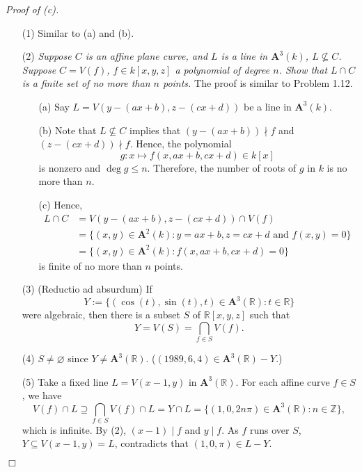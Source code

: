 \documentclass{article}
\begin{document}
\emph{Proof of (c).}
\begin{enumerate}
\item[(1)]
  Similar to (a) and (b).

\item[(2)]
  \emph{Suppose $C$ is an affine plane curve,
  and $L$ is a line in $\mathbf{A}^3(k)$,
  $L \not\subseteq C$.
  Suppose $C = V(f)$, $f \in k[x,y,z]$ a polynomial of degree $n$.
  Show that $L \cap C$ is a finite set of no more than $n$ points.}
  The proof is similar to Problem 1.12.
  \begin{enumerate}
  \item[(a)]
    Say $L = V(y - (ax + b), z - (cx + d))$ be a line in $\mathbf{A}^3(k)$.

  \item[(b)]
    Note that $L \not\subseteq C$ implies that
    $(y - (ax + b)) \nmid f$ and $(z - (cx + d)) \nmid f$.
    Hence, the polynomial
    \[
      g: x \mapsto f(x,ax + b, cx + d) \in k[x]
    \]
    is nonzero and $\deg g \leq n$.
    Therefore, the number of roots of $g$ in $k$ is no more than $n$.

  \item[(c)]
    Hence,
    \begin{align*}
      L \cap C
      &= V(y - (ax + b), z - (cx + d)) \cap V(f) \\
      &= \{ (x,y) \in \mathbf{A}^2(k) : y = ax + b, z = cx + d \text{ and } f(x,y) = 0 \} \\
      &= \{ (x,y) \in \mathbf{A}^2(k) : f(x, ax + b, cx + d) = 0 \}
    \end{align*}
    is finite of no more than $n$ points.
  \end{enumerate}

\item[(3)]
  (Reductio ad absurdum)
  If
  \[
    Y := \{ (\cos(t), \sin(t), t) \in \mathbf{A}^3(\mathbb{R}) : t \in \mathbb{R} \}
  \]
  were algebraic,
  then there is a subset $S$ of $\mathbb{R}[x,y,z]$ such that
  \[
    Y = V(S) = \bigcap_{f \in S} V(f).
  \]

\item[(4)]
  $S \neq \varnothing$ since $Y \neq \mathbf{A}^{3}(\mathbb{R})$.
  ($(1989,6,4) \in \mathbf{A}^{3}(\mathbb{R})-Y$.)

\item[(5)]
  Take a fixed line $L = V(x-1,y)$ in $\mathbf{A}^{3}(\mathbb{R})$.
  For each affine curve $f \in S$, we have
  \[
    V(f) \cap L
    \supseteq
    \bigcap_{f \in S} V(f) \cap L
    = Y \cap L
    = \{ (1,0,2n\pi) \in \mathbf{A}^{3}(\mathbb{R}) : n \in \mathbb{Z} \},
  \]
  which is infinite.
  By (2), $(x-1) \mid f$ and $y \mid f$.
  As $f$ runs over $S$, $Y \subseteq V(x-1,y) = L$,
  contradicts that $(1,0,\pi) \in L-Y$.
\end{enumerate}
$\Box$ \\
\end{document}
